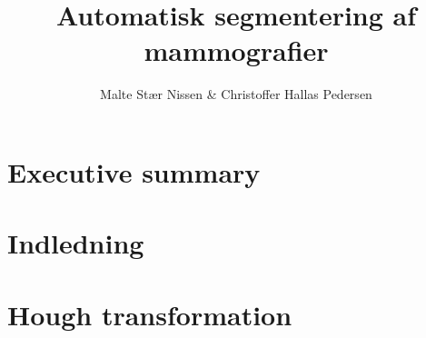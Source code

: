 \documentclass[11pt,a4paper]{article}
\title{Automatisk segmentering af mammografier}
\author{Malte Stær Nissen \& Christoffer Hallas Pedersen}
\begin{document}


\newpage

\tableofcontents
\newpage

\section{Executive summary}

\section{Indledning}

\section{Hough transformation}



\end{document}
